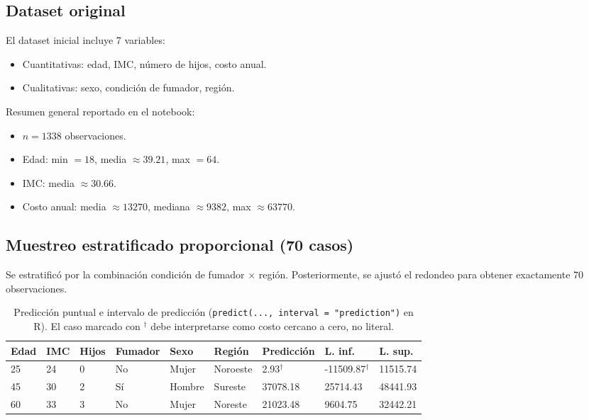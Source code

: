 \documentclass[12pt,a4paper]{article}
\begin{document}
\subsection{Dataset original}
El dataset inicial incluye 7 variables:
\begin{itemize}
    \item Cuantitativas: edad, IMC, número de hijos, costo anual.
    \item Cualitativas: sexo, condición de fumador, región.
\end{itemize}

Resumen general reportado en el notebook:
\begin{itemize}
    \item \(n=1338\) observaciones.
    \item Edad: min \(=18\), media \(\approx 39.21\), max \(=64\).
    \item IMC: media \(\approx 30.66\).
    \item Costo anual: media \(\approx 13270\), mediana \(\approx 9382\), max \(\approx 63770\).
\end{itemize}

\subsection{Muestreo estratificado proporcional (70 casos)}
Se estratificó por la combinación condición de fumador \(\times\) región. Posteriormente, se ajustó el redondeo para obtener exactamente 70 observaciones.

\begin{table}[H]
\centering
\caption{Predicción puntual e intervalo de predicción (\texttt{predict(..., interval = "prediction")} en R). El caso marcado con \(^{\dagger}\) debe interpretarse como costo cercano a cero, no literal.}
\addtolength{\tabcolsep}{-2pt} %
\begin{tabularx}{\textwidth}{@{} *{4}{X} *{2}{l} *{3}{X} @{}}
\toprule
\textbf{Edad} & \textbf{IMC} & \textbf{Hijos} & \textbf{Fumador} & \textbf{Sexo} & \textbf{Región} & \textbf{Predicción} & \textbf{L. inf.} & \textbf{L. sup.} \\
\midrule
25 & 24 & 0 & No & Mujer & Noroeste & 2.93\(^{\dagger}\) & -11509.87\(^{\dagger}\) & 11515.74 \\
45 & 30 & 2 & Sí & Hombre & Sureste & 37078.18 & 25714.43 & 48441.93 \\
60 & 33 & 3 & No & Mujer & Noreste & 21023.48 & 9604.75 & 32442.21 \\
\bottomrule
\end{tabularx}
\end{table}
\end{document}
